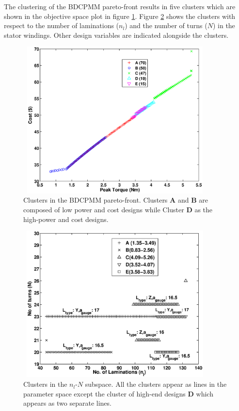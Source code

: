 The clustering of the BDCPMM pareto-front results in five clusters which
are shown in the objective space plot in figure \ref{bClustersO}.  Figure
\ref{bClustersP} shows the clusters with respect to the number of
laminations ($n_l$) and the number of turns ($N$) in the stator windings.
Other design variables are indicated alongside the clusters.

\begin{figure}[ht]
  \begin{center}
    \includegraphics[width=100mm, height=80mm]{dia/bClustersO3.eps} 
    \caption{Clusters in the BDCPMM pareto-front. Clusters \textbf{A} and
      \textbf{B} are composed of low power and cost designs while Cluster
      \textbf{D} as the high-power and cost designs.}
    \label{bClustersO}
  \end{center}
\end{figure}

\begin{figure}[ht]
  \begin{center}
    \includegraphics[width=100mm, height=80mm]{dia/bclustersp3.eps} 
    \caption{Clusters in the $n_l$-$N$ subspace. All the clusters appear as
      lines in the parameter space except the cluster of high-end designs
      \textbf{D} which appears as two separate lines.}
    \label{bClustersP}
  \end{center}
\end{figure}
 
